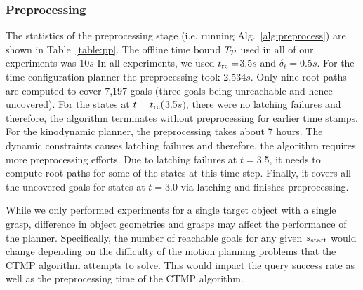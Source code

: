 \documentclass[a4paper]{report}
\begin{document}
\subsubsection{Preprocessing}
The statistics of the preprocessing stage (i.e. running Alg.~\ref{alg:preprocess}) are shown in Table~\ref{table:pp}. The offline time bound $T_{\mathcal{P}}$ used in all of our experiments was 10$s$
%
%
%
In all experiments, we used $t_{\textrm{rc}} =$3.5$s$ and $\delta_t = $0.5$s$.
%
For the time-configuration planner the preprocessing took 2,534$s$. Only nine root paths are computed to cover 7,197 goals (three goals being unreachable and hence uncovered). For the states at $t=t_{\textrm{rc}} ($3.5$s)$, there were no latching failures and therefore, the algorithm terminates without preprocessing for earlier time stamps.
%
For the kinodynamic planner, the preprocessing takes about 7 hours. The dynamic constraints causes latching failures and therefore, the algorithm requires more preprocessing efforts. Due to latching failures at $t=$3.5, it needs to compute root paths for some of the states at this time step. Finally, it covers all the uncovered goals for states at $t=$3.0 via latching and finishes preprocessing.

While we only performed experiments for a single target object with a single grasp, difference in object geometries and grasps may affect the performance of the planner. Specifically, the number of reachable goals for any given $s_{\textrm{start}}$ would change depending on the difficulty of the motion planning problems that the CTMP algorithm attempts to solve. This would impact the query success rate as well as the preprocessing time of the CTMP algorithm.
\end{document}
